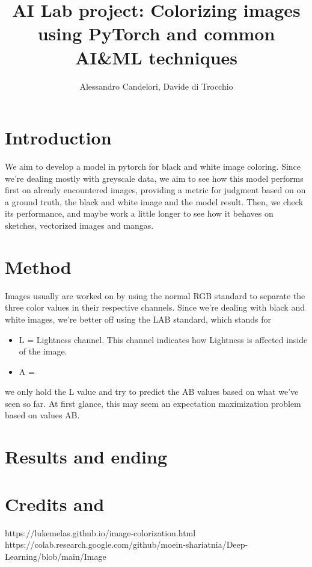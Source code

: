 \documentclass{article}
\title{AI Lab project: Colorizing images using PyTorch and common AI&ML techniques  }
\author{Alessandro Candelori, Davide di Trocchio}
\begin{document}
\maketitle
\tableofcontents
\newpage

\section{Introduction}
We aim to develop a model in pytorch for black and white image coloring. Since we're dealing mostly 
with greyscale data, we aim to see how this model performs first on already encountered images, 
providing a metric for judgment based on on a ground truth, the black and white image and the model result. 
Then, we check its performance, and maybe work a little longer to see how it behaves on sketches, 
vectorized images and mangas. 

\section{Method}
Images usually are worked on by using the normal RGB standard to separate the three color values in 
their respective channels. Since we're dealing with black and white images, we're better off using the 
LAB standard, which stands for \begin{itemize}
    \item L = Lightness channel. This channel indicates how Lightness is affected inside 
            of the image. 
    \item A = 

\end{itemize}

we only hold the L value and try to predict the AB values 
based on what we've seen so far. At first glance, this may seem an expectation maximization problem
based on values AB.  

\section{Results and ending}


\section{Credits and }
https://lukemelas.github.io/image-colorization.html
https://colab.research.google.com/github/moein-shariatnia/Deep-Learning/blob/main/Image%
\end{document}
